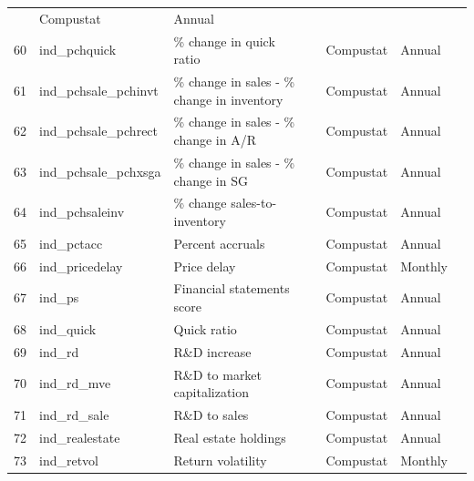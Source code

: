 \documentclass[a4paper, table]{article}
\begin{document}
\begin{landscape}
\begin{center}
\begin{longtable}{lllllll}
				\cite{abarbanell_abnormal_1998} & Compustat & Annual \\
			60 & ind\_pchquick\footnotemark[\value{footnote}] & \% change in quick ratio & 
				\cite{ou_financial_1989} & Compustat & Annual \\
			61 & ind\_pchsale\_pchinvt\footnotemark[\value{footnote}] & \% change in sales - \% change in inventory & 
				\cite{abarbanell_abnormal_1998} & Compustat & Annual \\
			62 & ind\_pchsale\_pchrect\footnotemark[\value{footnote}] & \% change in sales - \% change in A/R & 
				\cite{abarbanell_abnormal_1998} & Compustat & Annual \\
			63 & ind\_pchsale\_pchxsga\footnotemark[\value{footnote}] & \% change in sales - \% change in SG & 
				\cite{abarbanell_abnormal_1998} & Compustat & Annual \\
			64 & ind\_pchsaleinv\footnotemark[\value{footnote}] & \% change sales-to-inventory & 
				\cite{ou_financial_1989} & Compustat & Annual \\
			65 & ind\_pctacc\footnotemark[\value{footnote}] & Percent accruals & 
				\cite{hafzalla_percent_2011} & Compustat & Annual \\
			66 & ind\_pricedelay & Price delay & 
				\cite{hou_market_2005} & Compustat & Monthly \\
			67 & ind\_ps & Financial statements score & 
				\cite{piotroski_value_2000} & Compustat & Annual \\
			68 & ind\_quick & Quick ratio & 
				\cite{ou_financial_1989} & Compustat & Annual \\
			69 & ind\_rd & R\&D increase & 
				\cite{eberhart_examination_2004} & Compustat & Annual \\
			70 & ind\_rd\_mve\footnotemark[\value{footnote}] & R\&D to market capitalization & 
				\cite{guo_explaining_2006} & Compustat & Annual \\
			71 & ind\_rd\_sale\footnotemark[\value{footnote}] & R\&D to sales & 
				\cite{guo_explaining_2006} & Compustat & Annual \\
			72 & ind\_realestate\footnotemark[\value{footnote}] & Real estate holdings & 
				\cite{tuzel_corporate_2010} & Compustat & Annual \\
			73 & ind\_retvol & Return volatility & 
				\cite{ang_cross-section_2006} & Compustat & Monthly \\

\end{longtable}
\end{center}
\end{landscape}
\end{document}
